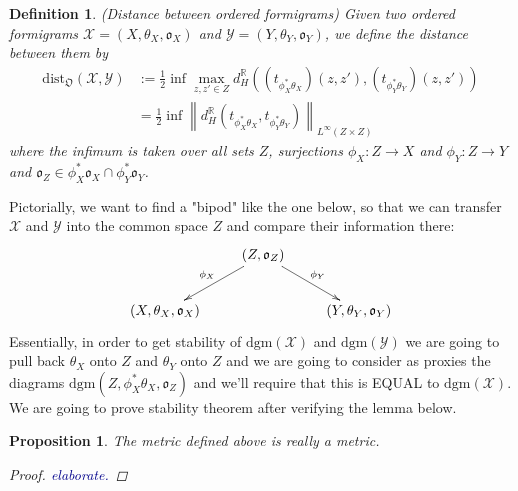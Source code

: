 \documentclass[a4paper,12pt]{article}
\newtheorem{proposition}{Proposition}[section]
\newtheorem{definition}{Definition}[section]
\newcommand{\woojin}[1]           {{ \textcolor{darkblue} {#1}}}
\newcommand{\norm}[1]{\left\lVert#1\right\rVert}
\begin{document}
\begin{definition} (Distance between ordered formigrams) Given two ordered formigrams $\mathcal{X} = (X,\theta_X, \mathfrak{o}_X)$ and $\mathcal{Y}=(Y,\theta_Y, \mathfrak{o}_Y)$, we define the distance between them by 
\begin{align*}\mathrm{dist}_\mathfrak{O}(\mathcal{X},\mathcal{Y})&:=\frac{1}{2}\inf\max_{z,z'\in Z} d_H^{\mathbb{R}}((t_{\phi_X^*\theta_X})(z,z'), (t_{\phi_Y^*\theta_{Y}})(z,z'))\\&=\frac{1}{2}\inf\norm{d_H^\mathbb{R}(t_{\phi_X^*\theta_{X}}, t_{\phi_Y^*\theta_{Y}})}_{L^\infty(Z\times Z)}
\end{align*}
where the infimum is taken over all sets $Z$, surjections $\phi_X:Z\rightarrow X$ and $\phi_Y:Z\rightarrow Y$ and $\mathfrak{o}_Z \in \phi_X^*\mathfrak{o}_X \cap \phi_Y^*\mathfrak{o}_Y$.
\end{definition}

Pictorially, we want to find a "bipod" like the one below, so that we can transfer $\mathcal{X}$ and $\mathcal{Y}$ into the common space $Z$ and compare their information there: 
\begin{displaymath}
\xymatrix{ &\ar[dl]_{\phi_X} (Z,\mathfrak{o}_Z) \ar[dr]^{\phi_Y}& \\(X,\theta_X,\mathfrak{o}_X)& &(Y,\theta_Y,\mathfrak{o}_Y)}
\end{displaymath}
Essentially, in order to get stability of $\mathrm{dgm}(\mathcal{X})$ and $\mathrm{dgm}(\mathcal{Y})$ we are going to pull back $\theta_X$ onto $Z$ and $\theta_Y$ onto $Z$ and we are going to consider as proxies the diagrams $\mathrm{dgm}(Z,\phi_X^\ast\theta_X,\mathfrak{o}_Z)$ and we'll require that this is EQUAL to $\mathrm{dgm}(\mathcal{X})$. We are going to prove stability theorem after verifying the lemma below.

\begin{proposition} The metric defined above is really a metric.
\begin{proof}\woojin{elaborate.}
\end{proof}

\end{proposition}
\end{document}

